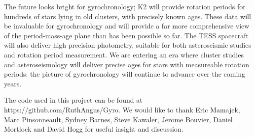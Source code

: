 \documentclass[12pt,preprint]{aastex}
\begin{document}
The future looks bright for gyrochronology; K2 will provide rotation periods for hundreds of stars lying in old clusters, with precisely known ages.
These data will be invaluable for gyrochronology and will provide a far more comprehensive view of the period-mass-age plane than has been possible so far.
The TESS spacecraft will also deliver high precision photometry, suitable for both asteroseismic studies and rotation period measurement.
We are entering an era where cluster studies and asteroseismology will deliver precise ages for stars with measureable rotation periods: the picture of gyrochronology will continue to advance over the coming years.

The code used in this project can be found at https://github.com/RuthAngus/Gyro.
We would like to thank Eric Mamajek, Marc Pinsonneault, Sydney Barnes, Steve Kawaler, Jerome Bouvier, Daniel Mortlock and David Hogg for useful insight and discussion.



\end{document}
